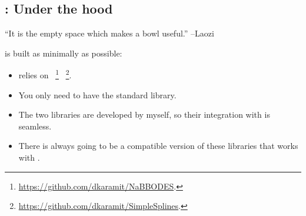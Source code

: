 \documentclass[10pt,utf8,compress,xcolor=dvipsnames]{beamer}
\begin{document}
\subsection{\mimes: Under the hood}
\begin{frame}{\insertsubsectionhead}
	\begin{center}
		``It is the empty space which makes a bowl useful.''
		\flushright --Laozi %
	\end{center}
	\mimes is built as minimally as possible:
	\\[0.3cm] 
	\begin{itemize}
		\item \mimes relies on ~\footnote{\fontF \href{https://github.com/dkaramit/NaBBODES}{https://github.com/dkaramit/NaBBODES}.} ~\footnote{\fontF \href{https://github.com/dkaramit/SimpleSplines}{https://github.com/dkaramit/SimpleSplines}.}.
		\item You only need to have the standard \CPP library.
		\item The two libraries are developed by myself, so their integration with \mimes is seamless.
		\item There is always going to be a compatible version of these libraries that works with \mimes.\\[0.3cm]
	\end{itemize}	
		
\end{frame}
%	
%	
%	
%	
\end{document}
